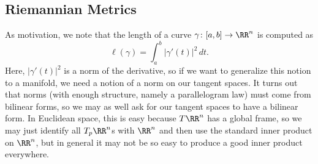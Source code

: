 \documentclass[../notes.tex]{subfiles}
\begin{document}
\subsection{Riemannian Metrics}
As motivation, we note that the length of a curve $\gamma\colon[a,b]\to\RR^n$ is computed as
\[\ell(\gamma)=\int_a^b\left|\gamma'(t)\right|^2\,dt.\]
Here, $\left|\gamma'(t)\right|^2$ is a norm of the derivative, so if we want to generalize this notion to a manifold, we need a notion of a norm on our tangent spaces. It turns out that norms (with enough structure, namely a parallelogram law) must come from bilinear forms, so we may as well ask for our tangent spaces to have a bilinear form. In Euclidean space, this is easy because $T\RR^n$ has a global frame, so we may just identify all $T_p\RR^n$s with $\RR^n$ and then use the standard inner product on $\RR^n$, but in general it may not be so easy to produce a good inner product everywhere.
\end{document}
